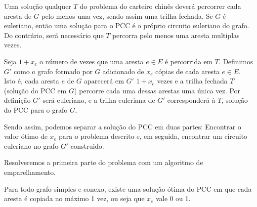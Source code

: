 Uma solução qualquer $T$ do problema do carteiro chinês deverá percorrer cada aresta de $G$ pelo menos uma vez, sendo assim uma trilha fechada.
Se $G$ é euleriano, então uma solução para o PCC é o próprio circuito euleriano do grafo.
Do contrário, será necessário que $T$ percorra pelo menos uma aresta multiplas vezes.

Seja $1 + x_e$ o número de vezes que uma aresta $e \in E$ é percorrida em $T$.
Definimos $G'$ como o grafo formado por $G$ adicionado de $x_e$ cópias de cada aresta $e \in E$. 
Isto é, cada aresta $e$ de $G$ aparecerá em $G'$ $1 + x_e$ vezes e a trilha fechada $T$ (solução do PCC em $G$) percorre cada uma dessas arestas uma única vez.
Por definição $G'$ será euleriano, e a trilha euleriana de $G'$ corresponderá à $T$, solução do PCC para o grafo $G$.

Sendo assim, podemos separar a solução do PCC em duas partes: Encontrar o valor ótimo de $x_e$ para o problema descrito e, em seguida, encontrar um circuito euleriano no grafo $G'$ construido.

Resolveremos a primeira parte do problema com um algoritmo de emparelhamento.



\begin{lemma} 
    \label{lemma-pcc}
    Para todo grafo simples e conexo, existe uma solução ótima do PCC em que cada aresta é copiada no máximo 1 vez, ou seja que $x_e$ vale 0 ou 1. 
\end{lemma}

